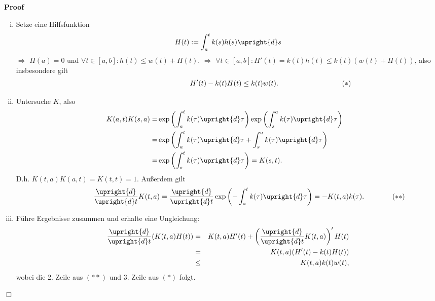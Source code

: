 \documentclass{book}
\newcommand{\assign}{:=}
\newenvironment{enumerateroman}{\begin{enumerate}[i.] }{\end{enumerate}}
\newenvironment{proof}{\noindent\textbf{Proof\ }}{\hspace*{\fill}$\Box$\medskip}
\begin{document}
\begin{proof}
  
  \begin{enumerateroman}
    \item Setze eine Hilfsfunktion
    \[ \text{} H (t) \assign \int_a^t k (s) h (s) \upright{d} s \]
    $\Rightarrow$ $H (a) = 0$ und $\forall t \in [a, b] : \text{} h (t) \leq w
    (t) + H (t) .${\hspace{14em}} $\Rightarrow$ $\forall t \in [a, b] : H' (t)
    = k (t) h (t) \leq k (t) (w (t) + H (t))$, also insbesondere gilt
    \[ \text{{\hspace{12em}}} H' (t) - k (t) H (t) \leq k (t) w (t) .
       \hspace{9em} (\ast) \]
    \item Untersuche $K$, also
    \begin{eqnarray*}
      K (a, t) K (s, a) = & \exp \left( \int_a^t k (\tau) \upright{d} \tau
      \right) \exp \left( \int_s^a k (\tau) \upright{d} \tau \right) & \\
      = & \exp \left( \int_a^t k (\tau) \upright{d} \tau + \int_s^a k (\tau)
      \upright{d} \tau \right) \qquad & \\
      = & \exp \left( \int_s^t k (\tau) \upright{d} \tau \right) = K (s, t) .
      \hspace{3em} & 
    \end{eqnarray*}
    D.h. $K (t, a) K (a, t) = K (t, t) = 1.${\hspace{21em}} Au{\ss}erdem gilt
    \[ \text{{\hspace{6em}}} \frac{\upright{d}}{\upright{d} t} K (t, a) =
       \frac{\upright{d}}{\upright{d} t} \exp \left( - \int_a^t k (\tau)
       \upright{d} \tau \right) = - K (t, a) k (\tau) . \hspace{4em} (\ast
       \ast) \]
    \item F{\"u}hre Ergebnisse zusammen und erhalte eine Ungleichung:
    \begin{eqnarray*}
      \frac{\upright{d}}{\upright{d} t} (K (t, a) H (t)) & = & K (t, a) H' (t)
      + \left( \frac{\upright{d}}{\upright{d} t} K (t, a) \right)' H (t)\\
      & = & K (t, a) (H' (t) - k (t) H (t))\\
      & \leq & K (t, a) k (t) w (t),
    \end{eqnarray*}
    wobei die 2. Zeile aus $(\ast \ast)$ und 3. Zeile aus $(\ast)$ folgt.
    

\end{enumerateroman}
\end{proof}
\end{document}
